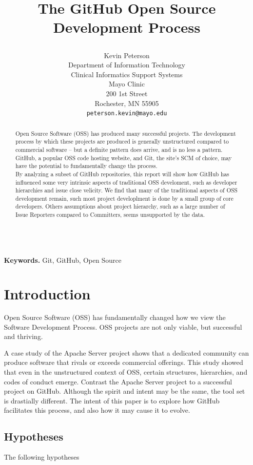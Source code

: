 \documentclass{proc}
\title{
The GitHub Open Source Development Process
\author{Kevin Peterson\\
Department of Information Technology\\
Clinical Informatics Support Systems\\
Mayo Clinic\\
200 1st Street\\
Rochester, MN  55905\\
\small \texttt{peterson.kevin@mayo.edu}
}
}
\begin{document}
\maketitle

\begin{abstract}
Open Source Software (OSS) has produced many successful projects. The development process by which these projects are produced is generally unstructured compared to commercial software -- but a definite pattern does arrive, and is no less a pattern. GitHub, a popular OSS code hosting website, and Git, the site's SCM of choice, may have the potential to fundamentally change ths process.\\
By analyzing a subset of GitHub repositories, this report will show how GitHub has influenced some very intrinsic aspects of traditional OSS develoment, such as developer hierarchies and issue close velicity. We find that many of the traditional aspects of OSS development remain, such most project developlment is done by a small group of core developers. Others assumptions about project hierarchy, such as a large number of Issue Reporters compared to Committers, seems unsupported by the data.

\end{abstract}

\noindent \\\textbf{Keywords.} Git, GitHub, Open Source

\section{Introduction}
Open Source Software (OSS) has fundamentally changed how we view the Software Development Process\cite{raymond1999cathedral}. OSS projects are not only viable, but successful and thriving. 

A case study of the Apache Server project\cite{mockus2000case} shows that a dedicated community can produce software that rivals or exceeds commercial offerings. This study showed that even in the unstructured context of OSS, certain structures, hierarchies, and codes of conduct emerge. Contrast the Apache Server project to a successful project on GitHub. Although the spirit and intent may be the same, the tool set is drastially different. The intent of this paper is to explore how GitHub facilitates this process, and also how it may cause it to evolve.

\subsection{Hypotheses}
The following hypotheses
\end{document}
